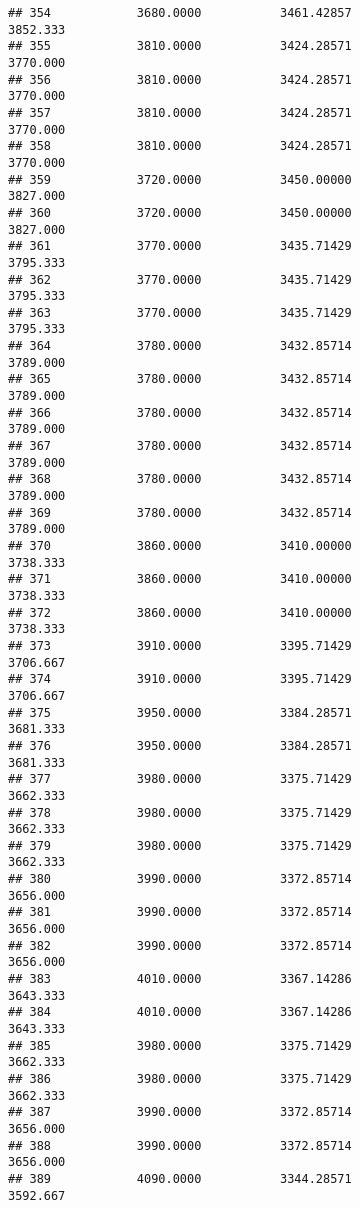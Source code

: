 \documentclass[]{article}
\begin{document}
\begin{verbatim}
## 354            3680.0000           3461.42857                3852.333
## 355            3810.0000           3424.28571                3770.000
## 356            3810.0000           3424.28571                3770.000
## 357            3810.0000           3424.28571                3770.000
## 358            3810.0000           3424.28571                3770.000
## 359            3720.0000           3450.00000                3827.000
## 360            3720.0000           3450.00000                3827.000
## 361            3770.0000           3435.71429                3795.333
## 362            3770.0000           3435.71429                3795.333
## 363            3770.0000           3435.71429                3795.333
## 364            3780.0000           3432.85714                3789.000
## 365            3780.0000           3432.85714                3789.000
## 366            3780.0000           3432.85714                3789.000
## 367            3780.0000           3432.85714                3789.000
## 368            3780.0000           3432.85714                3789.000
## 369            3780.0000           3432.85714                3789.000
## 370            3860.0000           3410.00000                3738.333
## 371            3860.0000           3410.00000                3738.333
## 372            3860.0000           3410.00000                3738.333
## 373            3910.0000           3395.71429                3706.667
## 374            3910.0000           3395.71429                3706.667
## 375            3950.0000           3384.28571                3681.333
## 376            3950.0000           3384.28571                3681.333
## 377            3980.0000           3375.71429                3662.333
## 378            3980.0000           3375.71429                3662.333
## 379            3980.0000           3375.71429                3662.333
## 380            3990.0000           3372.85714                3656.000
## 381            3990.0000           3372.85714                3656.000
## 382            3990.0000           3372.85714                3656.000
## 383            4010.0000           3367.14286                3643.333
## 384            4010.0000           3367.14286                3643.333
## 385            3980.0000           3375.71429                3662.333
## 386            3980.0000           3375.71429                3662.333
## 387            3990.0000           3372.85714                3656.000
## 388            3990.0000           3372.85714                3656.000
## 389            4090.0000           3344.28571                3592.667

\end{verbatim}
\end{document}
